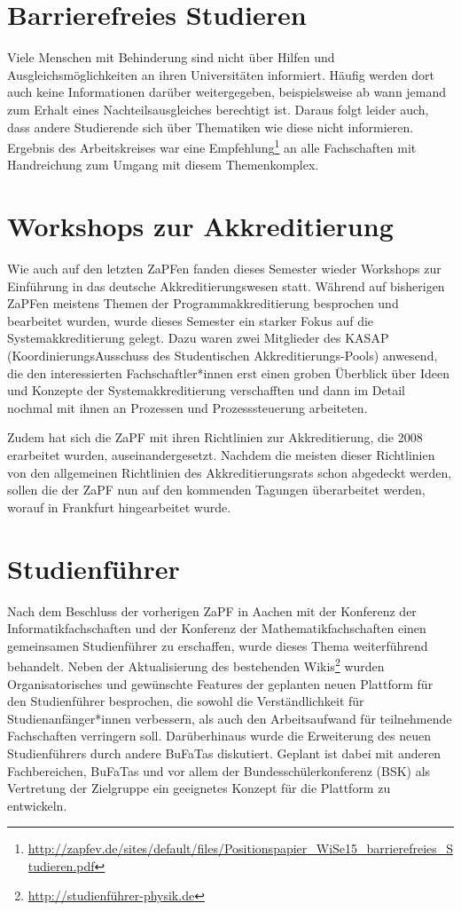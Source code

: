 \section*{Barrierefreies Studieren}
Viele Menschen mit Behinderung sind nicht über Hilfen und
Ausgleichsmöglichkeiten an ihren Universitäten informiert. Häufig werden dort
auch keine Informationen darüber weitergegeben, beispielsweise ab wann jemand
zum Erhalt eines Nachteilsausgleiches berechtigt ist. Daraus folgt leider auch,
dass andere Studierende sich über Thematiken wie diese nicht informieren.  Ergebnis des
Arbeitskreises war eine
Empfehlung\footnote{\href{http://zapfev.de/sites/default/files/Positionspapier\_WiSe15\_barrierefreies\_Studieren.pdf}{\url{http://zapfev.de/sites/default/files/Positionspapier\_WiSe15\_barrierefreies\_Studieren.pdf}}}
an alle Fachschaften mit Handreichung zum Umgang mit diesem Themenkomplex.

\section*{Workshops zur Akkreditierung} Wie auch auf den letzten ZaPFen fanden
dieses Semester wieder Workshops zur Einführung in das deutsche
Akkreditierungswesen statt. Während auf bisherigen ZaPFen meistens Themen der
Programmakkreditierung besprochen und bearbeitet wurden, wurde dieses Semester
ein starker Fokus auf die Systemakkreditierung gelegt. Dazu waren zwei
Mitglieder des KASAP (KoordinierungsAusschuss des Studentischen
Akkreditierungs-Pools) anwesend, die den interessierten Fachschaftler*innen erst einen groben Überblick über Ideen und Konzepte der
Systemakkreditierung verschafften und dann im Detail nochmal mit ihnen an
Prozessen und Prozesssteuerung arbeiteten.

Zudem hat sich die ZaPF mit ihren Richtlinien zur Akkreditierung, die 2008
erarbeitet wurden, auseinandergesetzt. Nachdem die meisten dieser Richtlinien
von den allgemeinen Richtlinien des Akkreditierungsrats schon abgedeckt werden,
sollen die der ZaPF nun auf den kommenden Tagungen überarbeitet werden, worauf
in Frankfurt hingearbeitet wurde.

\section*{Studienführer}
Nach dem Beschluss der vorherigen ZaPF in Aachen mit der Konferenz der
Informatikfachschaften und der Konferenz der Mathematikfachschaften einen
gemeinsamen Studienführer zu  erschaffen, wurde dieses Thema weiterführend
behandelt. Neben der Aktualisierung des bestehenden
Wikis\footnote{\url{http://studienführer-physik.de}} wurden Organisatorisches
und gewünschte Features der geplanten neuen Plattform für den Studienführer
besprochen, die sowohl die Verständlichkeit für Studienanfänger*innen verbessern, als
auch den Arbeitsaufwand für teilnehmende Fachschaften verringern soll.
Darüberhinaus wurde die Erweiterung des neuen Studienführers durch andere
BuFaTas diskutiert. Geplant ist dabei  mit anderen Fachbereichen, BuFaTas und
vor allem der Bundesschülerkonferenz (BSK) als Vertretung der Zielgruppe ein
geeignetes Konzept für die Plattform zu entwickeln.

